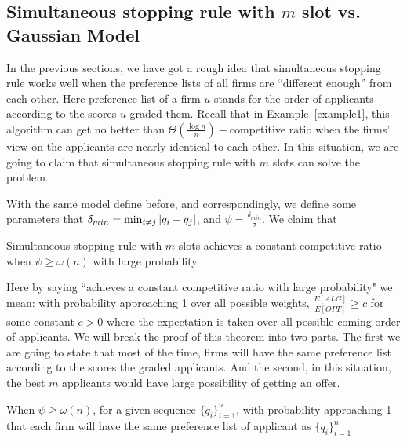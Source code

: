 \subsection{Simultaneous stopping rule with $m$ slot vs. Gaussian Model}\label{gaussian2}

In the previous sections, we have got a rough idea that simultaneous stopping rule works well when the preference lists of all firms are ``different enough'' from each other.
Here preference list of a firm $u$ stands for the order of applicants 
according to the scores $u$ graded them.
Recall that in Example~\ref{example1}, this algorithm can get no better than $\Theta(\frac{\log n}{n})-$competitive ratio when the firms' view on the applicants are nearly identical to each other.
In this situation, we are going to claim that simultaneous stopping rule with $m$ slots can solve the problem.

With the same model define before, and correspondingly, we
define some parameters that $\delta_{min} = \min_{i \neq j} \left\vert q_i - q_j\right\vert$, and
$\psi = \frac{\delta_{min}}{\sigma}$.
We claim that


\begin{theorem} \label{northm2}
    Simultaneous stopping rule with $m$ slots achieves a constant competitive
    ratio when $\psi \ge \omega(n)$ with large probability.
\end{theorem}

Here by saying ``achieves a constant competitive ratio with large probability" we mean:
with probability approaching 1 over all possible weights,
$\frac{E[ALG]}{E[OPT]} \ge c$ for some constant $c > 0$ where
the expectation is taken over all possible coming order of applicants.
We will break the proof of this theorem into two parts.
The first we are going to state that most of the time, firms will have the same preference
list according to the scores the graded applicants. And the second, in this situation, 
the best $m$ applicants would have large possibility of getting an offer.

\begin{lemma} \label{orderlem}
    When $\psi \ge \omega(n)$, for a given sequence $\{q_i\}_{i=1}^{n}$, with probability approaching 1 that
    each firm will have the same preference list of applicant as $\{q_i\}_{i=1}^{n}$

\end{lemma}

